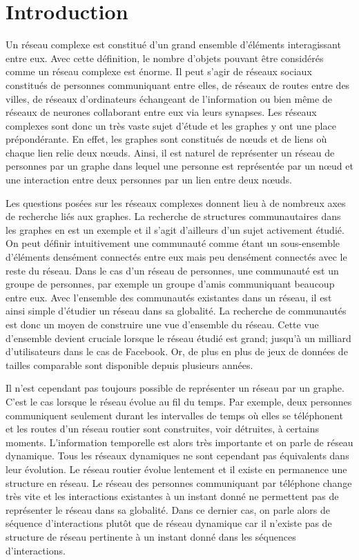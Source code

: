
\chapter*{Introduction}

Un réseau complexe est constitué d'un grand ensemble d'éléments interagissant entre eux.
Avec cette définition, le nombre d'objets pouvant être considérés comme un réseau complexe est énorme.
Il peut s'agir de réseaux sociaux constitués de personnes communiquant entre elles, de réseaux de routes entre des villes, de réseaux d'ordinateurs échangeant de l'information ou bien même de réseaux de neurones collaborant entre eux via leurs synapses.
Les réseaux complexes sont donc un très vaste sujet d'étude et les graphes y ont une place prépondérante.
En effet, les graphes sont constitués de n\oe uds et de liens où chaque lien relie deux n\oe uds.
Ainsi, il est naturel de représenter un réseau de personnes par un graphe dans lequel une personne est représentée par un n\oe ud et une interaction entre deux personnes par un lien entre deux n\oe uds.

Les questions posées sur les réseaux complexes donnent lieu à de nombreux axes de recherche liés aux graphes.
La recherche de structures communautaires dans les graphes en est un exemple et il s'agit d'ailleurs d'un sujet activement étudié.
On peut définir intuitivement une communauté comme étant un sous-ensemble d’éléments densément connectés entre eux mais peu densément connectés avec le reste du réseau.
Dans le cas d'un réseau de personnes, une communauté est un groupe de personnes, par exemple un groupe d'amis communiquant beaucoup entre eux.
Avec l'ensemble des communautés existantes dans un réseau, il est ainsi simple d'étudier un réseau dans sa globalité.
La recherche de communautés est donc un moyen de construire une vue d'ensemble du réseau.
Cette vue d'ensemble devient cruciale lorsque le réseau étudié est grand; jusqu'à un milliard d'utilisateurs dans le cas de Facebook.
Or, de plus en plus de jeux de données de tailles comparable sont disponible depuis plusieurs années.


Il n'est cependant pas toujours possible de représenter un réseau par un graphe.
C'est le cas lorsque le réseau évolue au fil du temps.
Par exemple, deux personnes communiquent seulement durant les intervalles de temps où elles se téléphonent et les routes d'un réseau routier sont construites, voir détruites, à certains moments.
L'information temporelle est alors très importante et on parle de réseau dynamique.
Tous les réseaux dynamiques ne sont cependant pas équivalents dans leur évolution.
Le réseau routier évolue lentement et il existe en permanence une structure en réseau.
Le réseau des personnes communiquant par téléphone change très vite et les interactions existantes à un instant donné ne permettent pas de représenter le réseau dans sa globalité.
Dans ce dernier cas, on parle alors de séquence d'interactions plutôt que de réseau dynamique car il n'existe pas de structure de réseau pertinente à un instant donné dans les séquences d'interactions.


